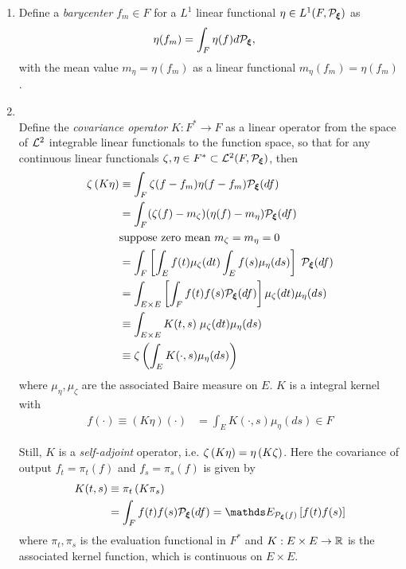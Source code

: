 \documentclass[11pt]{article}
\begin{document}
\begin{itemize}
\begin{definition}
\begin{enumerate}
\item Define a \emph{barycenter} $f_{m}\in F$ for a $L^{1}$ linear functional $\eta \in L^{1}(F, {\mathcal P}_{\boldsymbol{\xi}})$ as 
\begin{align*}
\eta(f_{m}) &= \int_{F}\eta(f) d {\mathcal P}_{\boldsymbol{\xi}}, 
\end{align*} with the mean value $m_{\eta}= \eta(f_{m})$ as a linear functional $m_{\eta}(f_{m})= \eta(f_{m})$.\\ 


\item \citep{lifshits2013gaussian} \\
Define the \emph{covariance operator} $K:  F^{*} \rightarrow F$ as a linear operator from the space of ${\mathcal L}^{2}$ integrable linear functionals to the function space, so that for any continuous linear functionals $\zeta, \eta \in F^{*} \subset {\mathcal L}^{2}(F, {\mathcal P}_{\boldsymbol{\xi}})$, then
\begin{align*}
\zeta\left(K \eta\right) &\equiv \int_{F}\zeta(f - f_{m})\eta(f - f_{m}){\mathcal P}_{\boldsymbol{\xi}}(df)\\
&= \int_{F} (\zeta(f) - m_{\zeta})(\eta(f) - m_{\eta})  {\mathcal P}_{\boldsymbol{\xi}}(df)\\
&\text{suppose zero mean } m_{\zeta}= m_{\eta}= 0\\
&= \int_{F} \left[\int_{E} f(t) \mu_{\zeta}(dt) \int_{E} f(s) \mu_{\eta}(ds)\right]\; {\mathcal P}_{\boldsymbol{\xi}}(df)\\
&= \int_{E\times E} \left[\int_{F}  f(t) f(s) {\mathcal P}_{\boldsymbol{\xi}}(df)\right]\mu_{\zeta}(dt)\mu_{\eta}(ds)\\
&\equiv  \int_{E\times E} K(t,s)\;\mu_{\zeta}(dt)\mu_{\eta}(ds)\\
&\equiv  \zeta\left( \int_{E}K(\cdot,s)\mu_{\eta}(ds)  \right)
\end{align*} where $\mu_{\eta}, \mu_{\zeta}$ are the associated Baire measure on $E$. $K$ is a integral kernel with 
\begin{align*}
f(\cdot)\equiv (K \eta)(\cdot)&= \int_{E}K(\cdot,s)\mu_{\eta}(ds) \in F
\end{align*}

Still, $K$ is a \emph{self-adjoint} operator, i.e. $\zeta\left(K \eta\right) = \eta\left(K \zeta\right) $. Here the covariance of output $f_{t}= \pi_{t}(f)$ and $f_{s} = \pi_{s}(f)$ is given by 
\begin{align*}
K(t,s)&\equiv \pi_{t}\paren{K \pi_{s}} \\
&=  \int_{F}  f(t) f(s)  \cP_{\mb{\xi}}(df)= \E{\cP_{\mb{\xi}}(f)}{f(t)f(s)}
\end{align*} where $\pi_{t} , \pi_{s}$ is the evaluation functional in $F^{*}$ and $K: E \times E \rightarrow {\mathbb R}$ is the associated kernel function, which is continuous on $E\times E$.


\end{enumerate}
\end{definition}
\end{itemize}
\end{document}

